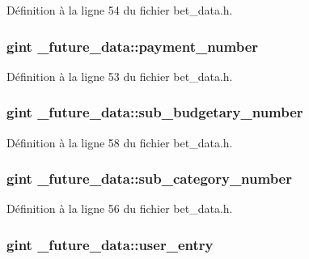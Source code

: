 Définition à la ligne 54 du fichier bet\_\-data.h.

\subsubsection[{payment\_\-number}]{\setlength{\rightskip}{0pt plus 5cm}gint {\bf \_\-future\_\-data::payment\_\-number}}\label{struct__future__data_a3db4223c031a32be201a67570597a1d7}


Définition à la ligne 53 du fichier bet\_\-data.h.

\subsubsection[{sub\_\-budgetary\_\-number}]{\setlength{\rightskip}{0pt plus 5cm}gint {\bf \_\-future\_\-data::sub\_\-budgetary\_\-number}}\label{struct__future__data_ad2718266256d134b54a69d46f032e32c}


Définition à la ligne 58 du fichier bet\_\-data.h.

\subsubsection[{sub\_\-category\_\-number}]{\setlength{\rightskip}{0pt plus 5cm}gint {\bf \_\-future\_\-data::sub\_\-category\_\-number}}\label{struct__future__data_a5a3ca7149f104db6bbdc1e4110b0046d}


Définition à la ligne 56 du fichier bet\_\-data.h.

\subsubsection[{user\_\-entry}]{\setlength{\rightskip}{0pt plus 5cm}gint {\bf \_\-future\_\-data::user\_\-entry}}\label{struct__future__data_a0ce6ae8765433eab3ccb2e692830cc15}


